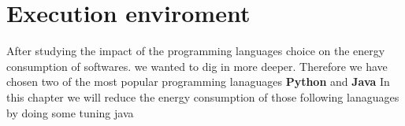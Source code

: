 \newpage

\chapter{Execution enviroment}
\label{chapter:enviroment}
After studying the impact of the programming languages choice on the energy consumption of softwares. we wanted to dig in more deeper. Therefore we have chosen two of the most popular programming lanaguages \textbf{Python} and \textbf{Java}
In this chapter we will reduce the energy consumption of those following lanaguages by doing some tuning
{java}